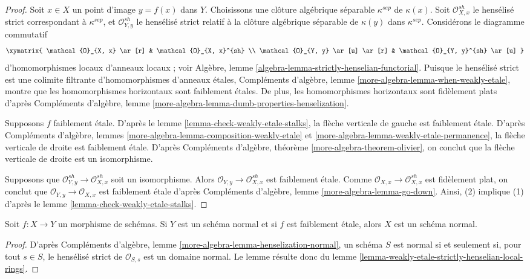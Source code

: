 \begin{proof}
Soit $x \in X$ un point d'image $y = f(x)$ dans $Y$.
Choisissons une clôture algébrique séparable $\kappa^{sep}$ de $\kappa(x)$.
Soit $\mathcal{O}_{X, x}^{sh}$ le hensélisé strict
correspondant à $\kappa^{sep}$, et $\mathcal{O}_{Y, y}^{sh}$
le hensélisé strict relatif à la clôture algébrique séparable
de $\kappa(y)$ dans $\kappa^{sep}$.
Considérons le diagramme commutatif
$$
\xymatrix{
\mathcal{O}_{X, x} \ar[r] & \mathcal{O}_{X, x}^{sh} \\
\mathcal{O}_{Y, y} \ar[u] \ar[r] & \mathcal{O}_{Y, y}^{sh} \ar[u]
}
$$
d'homomorphismes locaux d'anneaux locaux ; voir
Algèbre, lemme \ref{algebra-lemma-strictly-henselian-functorial}.
Puisque le hensélisé strict est une colimite filtrante d'homomorphismes d'anneaux \'etales,
Compléments d'algèbre, lemme \ref{more-algebra-lemma-when-weakly-etale},
montre que les homomorphismes horizontaux sont faiblement \'etales.
De plus, les homomorphismes horizontaux sont fidèlement plats d'après
Compléments d'algèbre, lemme \ref{more-algebra-lemma-dumb-properties-henselization}.

\medskip\noindent
Supposons $f$ faiblement \'etale. D'après le lemme \ref{lemma-check-weakly-etale-stalks},
la flèche verticale de gauche est faiblement \'etale. D'après
Compléments d'algèbre, lemmes \ref{more-algebra-lemma-composition-weakly-etale} et
\ref{more-algebra-lemma-weakly-etale-permanence},
la flèche verticale de droite est faiblement \'etale. D'après
Compléments d'algèbre, théorème \ref{more-algebra-theorem-olivier},
on conclut que la flèche verticale de droite est un isomorphisme.

\medskip\noindent
Supposons que $\mathcal{O}_{Y, y}^{sh} \to \mathcal{O}_{X, x}^{sh}$ soit un isomorphisme.
Alors $\mathcal{O}_{Y, y} \to \mathcal{O}_{X, x}^{sh}$ est faiblement \'etale.
Comme $\mathcal{O}_{X, x} \to \mathcal{O}_{X, x}^{sh}$ est fidèlement
plat, on conclut que $\mathcal{O}_{Y, y} \to \mathcal{O}_{X, x}$
est faiblement \'etale d'après
Compléments d'algèbre, lemme \ref{more-algebra-lemma-go-down}.
Ainsi, (2) implique (1) d'après le lemme \ref{lemma-check-weakly-etale-stalks}.
\end{proof}

\begin{lemma}
\label{lemma-normal-goes-up}
Soit $f : X \to Y$ un morphisme de schémas. Si $Y$ est un schéma normal
et si $f$ est faiblement \'etale, alors $X$ est un schéma normal.
\end{lemma}

\begin{proof}
D'après Compléments d'algèbre, lemme \ref{more-algebra-lemma-henselization-normal},
un schéma $S$ est normal si et seulement si, pour tout $s \in S$,
le hensélisé strict de $\mathcal{O}_{S, s}$ est un domaine normal.
Le lemme résulte donc du
lemme \ref{lemma-weakly-etale-strictly-henselian-local-rings}.
\end{proof}

